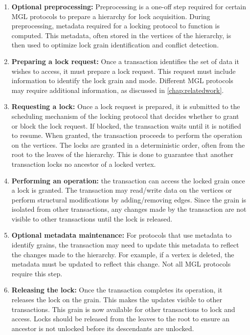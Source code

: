 \begin{enumerate}
    \item \textbf{Optional preprocessing:} Preprocessing is a one-off step required for certain MGL protocols to prepare a hierarchy for lock acquisition. During preprocessing, metadata required for a locking protocol to function is computed. This metadata, often stored in the vertices of the hierarchy, is then used to optimize lock grain identification and conflict detection. 
    \item \textbf{Preparing a lock request:} Once a transaction identifies the set of data it wishes to access, it must prepare a lock request. This request must include information to identify the lock grain and mode. Different MGL protocols may require additional information, as discussed in \cref{chap:relatedwork}.
    \item \textbf{Requesting a lock:} Once a lock request is prepared, it is submitted to the scheduling mechanism of the locking protocol that decides whether to grant or block the lock request. If blocked, the transaction waits until it is notified to resume. When granted, the transaction proceeds to perform the operation on the vertices. The locks are granted in a deterministic order, often from the root to the leaves of the hierarchy. This is done to guarantee that another transaction locks no ancestor of a locked vertex. 
    \item \textbf{Performing an operation:} the transaction can access the locked grain once a lock is granted. The transaction may read/write data on the vertices or perform structural modifications by adding/removing edges. Since the grain is isolated from other transactions, any changes made by the transaction are not visible to other transactions until the lock is released.
    \item \textbf{Optional metadata maintenance:} For protocols that use metadata to identify grains, the transaction may need to update this metadata to reflect the changes made to the hierarchy. For example, if a vertex is deleted, the metadata must be updated to reflect this change. Not all MGL protocols require this step.
    \item \textbf{Releasing the lock:} Once the transaction completes its operation, it releases the lock on the grain. This makes the updates visible to other transactions. This grain is now available for other transactions to lock and access. Locks should be released from the leaves to the root to ensure an ancestor is not unlocked before its descendants are unlocked.
\end{enumerate}



